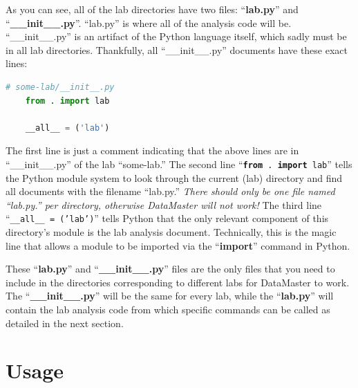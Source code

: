 \documentclass[12pt]{article}
\begin{document}
{As you can see, all of the lab directories have two files: ``\textbf{lab.py}'' and ``\textbf{\_\_init\_\_.py}''. ``lab.py'' is where all of the analysis code will be. ``\_\_init\_\_.py'' is an artifact of the Python language itself, which sadly must be in all lab directories. Thankfully, all ``\_\_init\_\_.py'' documents have these exact lines:
\begin{framed}
  \begin{lstlisting}[language=Python]
    # some-lab/__init__.py
    from . import lab

    __all__ = ('lab')
  \end{lstlisting}
\end{framed}
The first line is just a comment indicating that the above lines are in ``\_\_init\_\_.py'' of the lab ``some-lab.'' The second line ``\texttt{\textbf{from} . \textbf{import} lab}'' tells the Python module system to look through the current (lab) directory and find all documents with the filename ``lab.py.'' \textit{There should only be one file named ``lab.py.'' per directory, otherwise DataMaster will not work!} The third line ``\texttt{\_\_all\_\_ = ('lab')}'' tells Python that the only relevant component of this directory's module is the lab analysis document. Technically, this is the magic line that allows a module to be imported via the ``\textbf{import}'' command in Python.

These ``\textbf{lab.py}'' and ``\textbf{\_\_init\_\_.py}'' files are the only files that you need to include in the directories corresponding to different labs for DataMaster to work. The ``\textbf{\_\_init\_\_.py}'' will be the same for every lab, while the ``\textbf{lab.py}'' will contain the lab analysis code from which specific commands can be called as detailed in the next section.

\section*{Usage}
\label{sec:usage}

}
\end{document}
